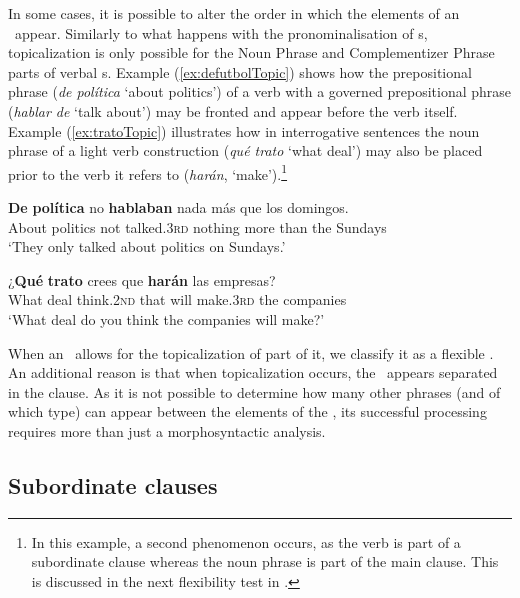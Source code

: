 \documentclass[output=paper]{langsci/langscibook}
\begin{document}
In some cases, it is possible to alter the order in which the elements of an \mwe\ appear.
Similarly to what happens with the pronominalisation of \mwe s, topicalization is only possible for the Noun Phrase and Complementizer Phrase parts of verbal \mwe s.
Example (\ref{ex:defutbolTopic}) shows how the prepositional phrase (\textit{de política} `about politics') of a verb with a governed prepositional phrase (\textit{hablar de} `talk about') may be fronted and appear before the verb itself.
Example (\ref{ex:tratoTopic}) illustrates how in interrogative sentences the noun phrase of a light verb construction (\textit{qué trato} `what deal') 
may also be placed prior to the verb it refers to (\textit{harán}, `make').\footnote{In this example, a second phenomenon occurs, as the verb is part of a subordinate clause whereas the noun phrase is part of the main clause. This is discussed in the next flexibility test in .}

\begin{exe}
\ex \label{ex:defutbolTopic}
\gll \textbf{De} \textbf{política} no \textbf{hablaban} nada más que los domingos. \\
About politics not {talked.\textsc{3rd}} nothing more than the Sundays \\
\glt `They only talked about politics on Sundays.'

\ex \label{ex:tratoTopic}
\gll ¿\textbf{Qué} \textbf{trato} crees que \textbf{harán} las empresas? \\
What deal {think.\textsc{2nd}} that {will make.\textsc{3rd}} the companies  \\
\glt `What deal do you think the companies will make?'
\end{exe}


When an \mwe\ allows for the topicalization of part of it, we classify it as a flexible \mwe.
An additional reason is that when topicalization occurs, the \mwe\ appears separated in the clause.
As it is not possible to determine how many other phrases (and of which type) can appear between the elements of the \mwe, its successful processing requires more than just a morphosyntactic analysis.

\subsection{Subordinate clauses}
\label{ssec:subordinateClauses}
\end{document}
